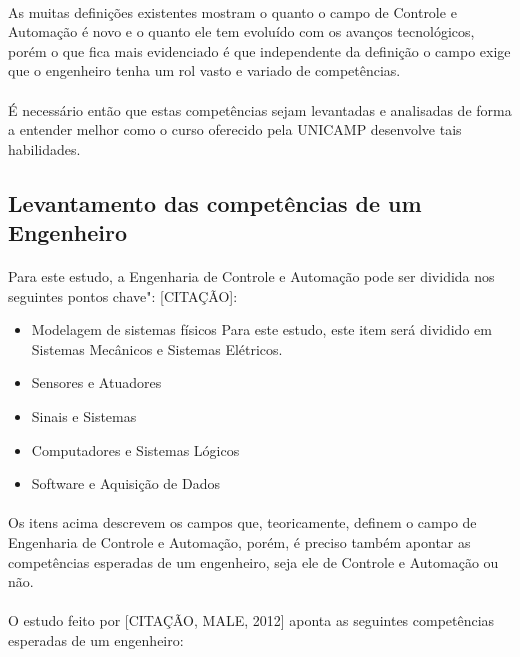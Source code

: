\documentclass[12pt]{article} %
\begin{document}
\paragraph{}As muitas definições existentes mostram o quanto o campo de Controle e Automação é novo e o quanto ele tem evoluído com os avanços tecnológicos, porém o que fica mais evidenciado é que independente da definição o campo exige que o engenheiro tenha um rol vasto e variado de competências.

\paragraph{}É necessário então que estas competências sejam levantadas e analisadas de forma a entender melhor como o curso oferecido pela UNICAMP desenvolve tais habilidades.


\subsection{Levantamento das competências de um Engenheiro}
\paragraph{}Para este estudo, a Engenharia de Controle e Automação pode ser dividida nos seguintes pontos chave": [CITAÇÃO]:

\begin{itemize}
\setlength\itemsep{0.01mm}
\item Modelagem de sistemas físicos
	\subitem Para este estudo, este item será dividido em Sistemas Mecânicos e Sistemas Elétricos.
\item Sensores e Atuadores
\item Sinais e Sistemas
\item Computadores e Sistemas Lógicos
\item Software e Aquisição de Dados
\end{itemize}

\paragraph{}Os itens acima descrevem os campos que, teoricamente, definem o campo de Engenharia de Controle e Automação, porém, é preciso também apontar as competências esperadas de um engenheiro, seja ele de Controle e Automação ou não.

\paragraph{}O estudo feito por [CITAÇÃO, MALE, 2012] aponta as seguintes competências esperadas de um engenheiro:
\end{document}
